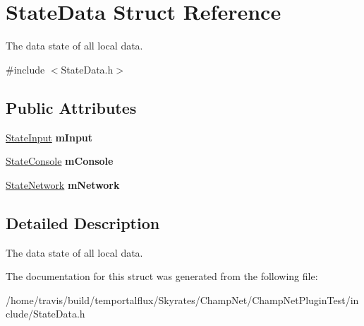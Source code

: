 \hypertarget{struct_state_data}{\section{State\-Data Struct Reference}
\label{struct_state_data}
}


The data state of all local data.  




{\ttfamily \#include $<$State\-Data.\-h$>$}

\subsection*{Public Attributes}
\begin{DoxyCompactItemize}
\item 
\hypertarget{struct_state_data_a0535bc84710174d9fc4051979e2d631b}{\hyperlink{struct_state_input}{State\-Input} {\bfseries m\-Input}}\label{struct_state_data_a0535bc84710174d9fc4051979e2d631b}

\item 
\hypertarget{struct_state_data_a55d003000ef9ac2290f9aff3c2e4437d}{\hyperlink{struct_state_console}{State\-Console} {\bfseries m\-Console}}\label{struct_state_data_a55d003000ef9ac2290f9aff3c2e4437d}

\item 
\hypertarget{struct_state_data_a0490590a43df414f8d751f50afbe926f}{\hyperlink{struct_state_network}{State\-Network} {\bfseries m\-Network}}\label{struct_state_data_a0490590a43df414f8d751f50afbe926f}

\end{DoxyCompactItemize}


\subsection{Detailed Description}
The data state of all local data. 

The documentation for this struct was generated from the following file\-:\begin{DoxyCompactItemize}
\item 
/home/travis/build/temportalflux/\-Skyrates/\-Champ\-Net/\-Champ\-Net\-Plugin\-Test/include/State\-Data.\-h\end{DoxyCompactItemize}
